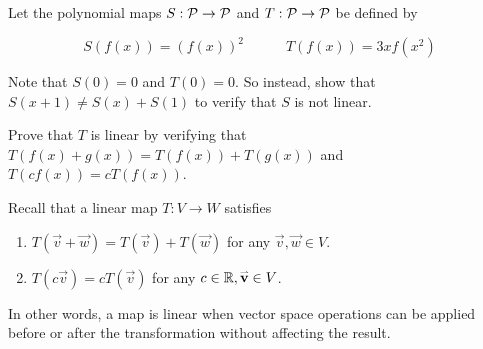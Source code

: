 \begin{activity}{20}
Let the polynomial maps \(S: \P \rightarrow \P\)
and \(T: \P \rightarrow \P\) be defined by

\[S(f(x)) = (f(x))^2 \hspace{3em} T(f(x)) = 3xf(x^2)\]

\begin{subactivity}
Note that \(S(0)=0\) and \(T(0)=0\). So instead,
show that \(S(x+1)\not= S(x)+S(1)\) to verify that \(S\) is not linear.
\end{subactivity}
\begin{subactivity}
Prove that \(T\) is linear by verifying that \(T(f(x)+g(x))=T(f(x))+T(g(x))\)
and \(T(cf(x))=cT(f(x))\).
\end{subactivity}
\end{activity}


\begin{remark}
Recall that a linear map \(T:V\rightarrow W\)
satisfies
\begin{enumerate}
\item \(T(\vec{v}+\vec{w}) = T(\vec{v})+T(\vec{w})\)
      for any \(\vec{v},\vec{w} \in V\).
\item \(T(c\vec{v}) = cT(\vec{v})\)
      for any \(c \in \IR,\vec{v} \in V\).
\end{enumerate}
In other words, a map is linear when vector space operations
can be applied before or after the transformation without affecting the result.
\end{remark}

